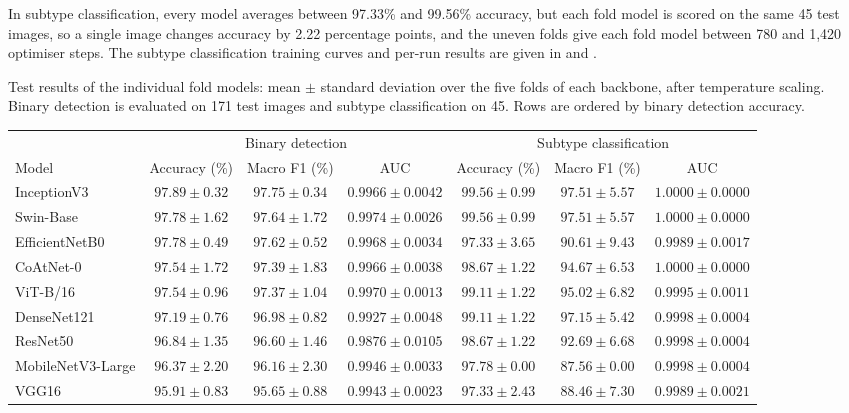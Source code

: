 \documentclass[a4paper,fleqn]{cas-sc}
\begin{document}
In subtype classification, every model averages between 97.33\% and 99.56\% accuracy, but each fold model is scored on the same 45 test images, so a single image changes accuracy by 2.22 percentage points, and the uneven folds give each fold model between 780 and 1,420 optimiser steps. The subtype classification training curves and per-run results are given in  and .

\begin{heretable}
\centering
\caption{Test results of the individual fold models: mean $\pm$ standard deviation over the five folds of each backbone, after temperature scaling. Binary detection is evaluated on 171 test images and subtype classification on 45. Rows are ordered by binary detection accuracy.}
\label{tab:cv}
\small
\setlength{\tabcolsep}{3pt}
\begin{tabular*}{\textwidth}{@{\extracolsep{\fill}}lcccccc@{}}
\toprule
 & \multicolumn{3}{c}{Binary detection} & \multicolumn{3}{c}{Subtype classification} \\
\cmidrule(lr){2-4}\cmidrule(l){5-7}
Model & Accuracy (\%) & Macro F1 (\%) & AUC & Accuracy (\%) & Macro F1 (\%) & AUC \\
\midrule
InceptionV3 & $97.89\pm 0.32$ & $97.75\pm 0.34$ & $0.9966\pm 0.0042$ & $99.56\pm 0.99$ & $97.51\pm 5.57$ & $1.0000\pm 0.0000$ \\
Swin-Base & $97.78\pm 1.62$ & $97.64\pm 1.72$ & $0.9974\pm 0.0026$ & $99.56\pm 0.99$ & $97.51\pm 5.57$ & $1.0000\pm 0.0000$ \\
EfficientNetB0 & $97.78\pm 0.49$ & $97.62\pm 0.52$ & $0.9968\pm 0.0034$ & $97.33\pm 3.65$ & $90.61\pm 9.43$ & $0.9989\pm 0.0017$ \\
CoAtNet-0 & $97.54\pm 1.72$ & $97.39\pm 1.83$ & $0.9966\pm 0.0038$ & $98.67\pm 1.22$ & $94.67\pm 6.53$ & $1.0000\pm 0.0000$ \\
ViT-B/16 & $97.54\pm 0.96$ & $97.37\pm 1.04$ & $0.9970\pm 0.0013$ & $99.11\pm 1.22$ & $95.02\pm 6.82$ & $0.9995\pm 0.0011$ \\
DenseNet121 & $97.19\pm 0.76$ & $96.98\pm 0.82$ & $0.9927\pm 0.0048$ & $99.11\pm 1.22$ & $97.15\pm 5.42$ & $0.9998\pm 0.0004$ \\
ResNet50 & $96.84\pm 1.35$ & $96.60\pm 1.46$ & $0.9876\pm 0.0105$ & $98.67\pm 1.22$ & $92.69\pm 6.68$ & $0.9998\pm 0.0004$ \\
MobileNetV3-Large & $96.37\pm 2.20$ & $96.16\pm 2.30$ & $0.9946\pm 0.0033$ & $97.78\pm 0.00$ & $87.56\pm 0.00$ & $0.9998\pm 0.0004$ \\
VGG16 & $95.91\pm 0.83$ & $95.65\pm 0.88$ & $0.9943\pm 0.0023$ & $97.33\pm 2.43$ & $88.46\pm 7.30$ & $0.9989\pm 0.0021$ \\
\bottomrule
\end{tabular*}
\end{heretable}
\end{document}
